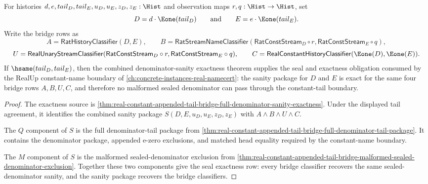 \begin{theorem}
\label{thm:real-constant-tail-obligation-seal-exactness}
For histories $d,e,tail_D,tail_E,u_D,u_E,z_D,z_E:\Hist$ and observation maps
$r,q:\Hist\to\Hist$, set
$$
D=d\cdot\Eone(tail_D)
\qquad\text{and}\qquad
E=e\cdot\Eone(tail_E).
$$
Write the bridge rows as
$$
A=\mathsf{RatHistoryClassifier}(D,E),
\qquad
B=\mathsf{RatStreamNameClassifier}(\mathsf{RatConstStream}_D\circ r,
\mathsf{RatConstStream}_E\circ q),
$$
$$
U=\mathsf{RealUnaryStreamClassifier}(\mathsf{RatConstStream}_D\circ r,
\mathsf{RatConstStream}_E\circ q),
\qquad
C=\mathsf{RealConstantHistoryClassifier}(\Eone(D),\Eone(E)).
$$
If $\hsame(tail_D,tail_E)$, then the combined denominator-sanity exactness
theorem supplies the seal and exactness obligation consumed by the RealUp
constant-name boundary of \autoref{ch:concrete-instances-real-namecert}: the
sanity package for $D$ and $E$ is exact for the same four bridge rows
$A,B,U,C$, and therefore no malformed sealed denominator can pass through the
constant-tail boundary.
\end{theorem}
\begin{proof}
The exactness source is
\autoref{thm:real-constant-appended-tail-bridge-full-denominator-sanity-exactness}.
Under the displayed tail agreement, it identifies the combined sanity package
$S(D,E,u_D,u_E,z_D,z_E)$ with $A\land B\land U\land C$.

The $Q$ component of $S$ is the full denominator-tail package from
\autoref{thm:real-constant-appended-tail-bridge-full-denominator-tail-package}.
It contains the denominator package, appended e-zero exclusions, and matched
head equality required by the constant-name boundary.

The $M$ component of $S$ is the malformed sealed-denominator exclusion from
\autoref{thm:real-constant-appended-tail-bridge-malformed-sealed-denominator-exclusion}.
Together these two components give the seal exactness row: every bridge
classifier recovers the same sealed-denominator sanity, and the sanity package
recovers the bridge classifiers.
\end{proof}
